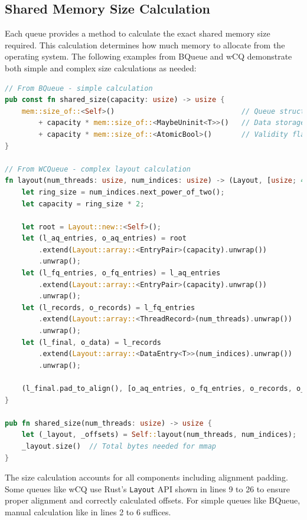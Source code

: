 \subsection{Shared Memory Size Calculation}

Each queue provides a method to calculate the exact shared memory size required. This calculation determines how much memory to allocate from the operating system. The following examples from BQueue and \ac{wCQ} demonstrate both simple and complex size calculations as needed:

\begin{lstlisting}[language=Rust, style=boxed, caption={Shared memory size calculation methods}, label={lst:size-calculation}]
// From BQueue - simple calculation
pub const fn shared_size(capacity: usize) -> usize {
    mem::size_of::<Self>()                              // Queue structure
        + capacity * mem::size_of::<MaybeUninit<T>>()   // Data storage
        + capacity * mem::size_of::<AtomicBool>()       // Validity flags
}

// From WCQueue - complex layout calculation
fn layout(num_threads: usize, num_indices: usize) -> (Layout, [usize; 4]) {
    let ring_size = num_indices.next_power_of_two();
    let capacity = ring_size * 2;
    
    let root = Layout::new::<Self>();
    let (l_aq_entries, o_aq_entries) = root
        .extend(Layout::array::<EntryPair>(capacity).unwrap())
        .unwrap();
    let (l_fq_entries, o_fq_entries) = l_aq_entries
        .extend(Layout::array::<EntryPair>(capacity).unwrap())
        .unwrap();
    let (l_records, o_records) = l_fq_entries
        .extend(Layout::array::<ThreadRecord>(num_threads).unwrap())
        .unwrap();
    let (l_final, o_data) = l_records
        .extend(Layout::array::<DataEntry<T>>(num_indices).unwrap())
        .unwrap();
    
    (l_final.pad_to_align(), [o_aq_entries, o_fq_entries, o_records, o_data])
}

pub fn shared_size(num_threads: usize) -> usize {
    let (_layout, _offsets) = Self::layout(num_threads, num_indices);
    _layout.size()  // Total bytes needed for mmap
}
\end{lstlisting}

The size calculation accounts for all components including alignment padding. Some queues like \ac{wCQ} use Rust's \texttt{Layout} API shown in lines 9 to 26 to ensure proper alignment and correctly calculated offsets. For simple queues like BQueue, manual calculation like in lines 2 to 6 suffices.


